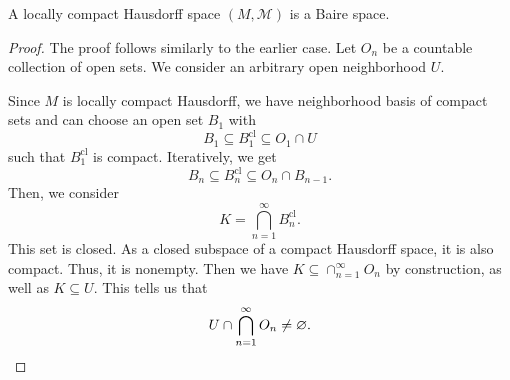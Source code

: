 \documentclass[twoside,symmetric, openany, 12pt]{./tuftebook}
\theoremstyle{definition}
\theoremstyle{definition}
\theoremstyle{definition}
\begin{document}
	\begin{Theorem}[Baire II]\label{thm:baire2}
		A locally compact Hausdorff space $(M, \mathcal{M})$ is a Baire space.
	\end{Theorem}
	\begin{proof}
		The proof follows similarly to the earlier case. Let $O_n$ be a countable collection of open sets. We consider an arbitrary open neighborhood $U$. 
		
		Since $M$ is locally compact Hausdorff, we have neighborhood basis of compact sets and can choose an open set $B_1$ with
		\[B_1 \subseteq B_1^\text{cl}\subseteq O_1 \cap U\]
		such that $B_1^\text{cl}$ is compact. Iteratively, we get
		\[B_n\subseteq B_n^\text{cl}\subseteq O_n\cap B_{n-1}.\]
		Then, we consider
		\[K = \bigcap_{n=1}^\infty B_n^\text{cl}.\]
		This set is closed. As a closed subspace of a compact Hausdorff space, it is also compact. Thus, it is nonempty. Then we have $K\subseteq \cap_{n=1}^\infty O_n$ by construction, as well as $K\subseteq U$. This tells us that
		\[U \cap \bigcap_{n=1}^\infty O_n\neq\varnothing.\qedhere\]
	\end{proof}
\end{document}
